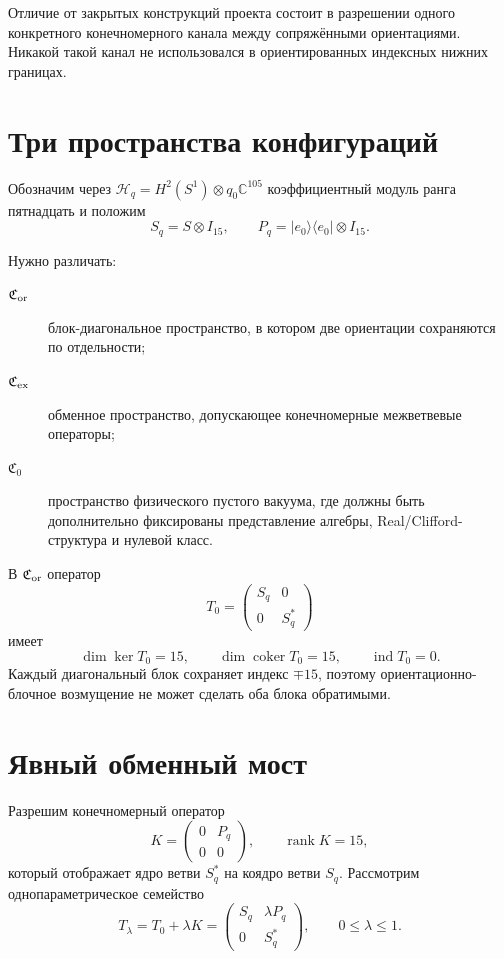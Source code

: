 Отличие от закрытых конструкций проекта состоит в разрешении одного
конкретного конечномерного канала между сопряжёнными ориентациями. Никакой
такой канал не использовался в ориентированных индексных нижних границах.

\section{Три пространства конфигураций}

Обозначим через $\mathcal H_q=H^2(S^1)\otimes q_0\mathbb C^{105}$
коэффициентный модуль ранга пятнадцать и положим
\begin{equation}
 S_q=S\otimes I_{15},
 \qquad
 P_q=|e_0\rangle\langle e_0|\otimes I_{15}.
\end{equation}

Нужно различать:
\begin{description}
 \item[$\mathfrak C_{\rm or}$] блок-диагональное пространство, в котором
 две ориентации сохраняются по отдельности;
 \item[$\mathfrak C_{\rm ex}$] обменное пространство, допускающее
 конечномерные межветвевые операторы;
 \item[$\mathfrak C_{0}$] пространство физического пустого вакуума,
 где должны быть дополнительно фиксированы представление алгебры,
 Real/Clifford-структура и нулевой класс.
\end{description}

В $\mathfrak C_{\rm or}$ оператор
\begin{equation}
 T_0=
 \begin{pmatrix}
  S_q&0\\
  0&S_q^*
 \end{pmatrix}
 \label{eq:v6-balanced-pair-t0}
\end{equation}
имеет
\begin{equation}
 \dim\ker T_0=15,
 \qquad
 \dim\operatorname{coker}T_0=15,
 \qquad
 \operatorname{ind}T_0=0.
\end{equation}
Каждый диагональный блок сохраняет индекс $\mp15$, поэтому
ориентационно-блочное возмущение не может сделать оба блока обратимыми.

\section{Явный обменный мост}

Разрешим конечномерный оператор
\begin{equation}
 K=
 \begin{pmatrix}
  0&P_q\\
  0&0
 \end{pmatrix},
 \qquad
 \operatorname{rank}K=15,
 \end{equation}
который отображает ядро ветви $S_q^*$ на коядро ветви $S_q$. Рассмотрим
однопараметрическое семейство
\begin{equation}
 T_\lambda=T_0+\lambda K
 =
 \begin{pmatrix}
  S_q&\lambda P_q\\
  0&S_q^*
 \end{pmatrix},
 \qquad 0\leq\lambda\leq1.
 \label{eq:v6-exchange-bridge-path}
\end{equation}

